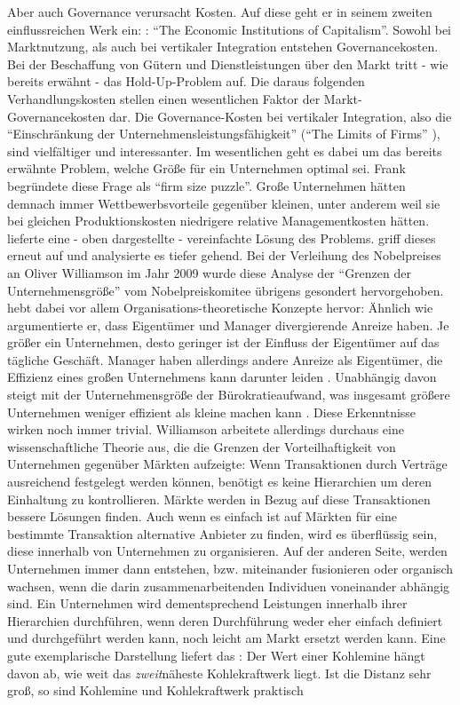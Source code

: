 Aber auch Governance verursacht Kosten. Auf diese geht er in seinem zweiten einflussreichen Werk ein: \textcite{Williamson1985}: "`The Economic Institutions of Capitalism"'. Sowohl bei Marktnutzung, als auch bei vertikaler Integration entstehen Governancekosten. Bei der Beschaffung von Gütern und Dienstleistungen über den Markt tritt - wie bereits erwähnt - das Hold-Up-Problem auf. Die daraus folgenden Verhandlungskosten stellen einen wesentlichen Faktor der Markt-Governancekosten dar. Die Governance-Kosten bei vertikaler Integration, also die "`Einschränkung der Unternehmensleistungsfähigkeit"' ("`The Limits of Firms"' \parencite[S. 131ff]{Williamson1985}), sind vielfältiger und interessanter. Im wesentlichen geht es dabei um das bereits erwähnte Problem, welche Größe für ein Unternehmen optimal sei. Frank \textcite{Knight1921} begründete diese Frage als "`firm size puzzle"'. Große Unternehmen hätten demnach immer Wettbewerbsvorteile gegenüber kleinen, unter anderem weil sie bei gleichen Produktionskosten niedrigere relative Managementkosten hätten. \textcite{Coase1937} lieferte eine - oben dargestellte - vereinfachte Lösung des Problems. \textcite[S. 131ff]{Williamson1985} griff dieses erneut auf und analysierte es tiefer gehend. Bei der Verleihung des Nobelpreises an Oliver Williamson im Jahr 2009 wurde diese Analyse der "`Grenzen der Unternehmensgröße"' vom Nobelpreiskomitee übrigens gesondert hervorgehoben. \textcite{Williamson1985} hebt dabei vor allem Organisations-theoretische Konzepte hervor: Ähnlich wie \textcite{Jensen1976} argumentierte er, dass Eigentümer und Manager divergierende Anreize haben. Je größer ein Unternehmen, desto geringer ist der Einfluss der Eigentümer auf das tägliche Geschäft. Manager haben allerdings andere Anreize als Eigentümer, die Effizienz eines großen Unternehmens kann darunter leiden \parencite[S. 144ff]{Williamson1985}. Unabhängig davon steigt mit der Unternehmensgröße der Bürokratieaufwand, was insgesamt größere Unternehmen weniger effizient als kleine machen kann \parencite[S. 148ff]{Williamson1985}. Diese Erkenntnisse wirken noch immer trivial. Williamson arbeitete allerdings durchaus eine wissenschaftliche Theorie aus, die die Grenzen der Vorteilhaftigkeit von Unternehmen gegenüber Märkten aufzeigte: Wenn Transaktionen durch Verträge ausreichend festgelegt werden können, benötigt es keine Hierarchien um deren Einhaltung zu kontrollieren. Märkte werden in Bezug auf diese Transaktionen bessere Lösungen finden. Auch wenn es einfach ist auf Märkten für eine bestimmte Transaktion  alternative Anbieter zu finden, wird es überflüssig sein, diese innerhalb von Unternehmen zu organisieren. Auf der anderen Seite, werden Unternehmen immer dann entstehen, bzw. miteinander fusionieren oder organisch wachsen, wenn die darin zusammenarbeitenden Individuen voneinander abhängig sind. Ein Unternehmen wird dementsprechend Leistungen innerhalb ihrer Hierarchien durchführen, wenn deren Durchführung weder eher einfach definiert und durchgeführt werden kann, noch leicht am Markt ersetzt werden kann. Eine gute exemplarische Darstellung liefert das \textcite{Nobelopreiskomitee2009}: Der Wert einer Kohlemine hängt davon ab, wie weit das \textit{zweit}näheste Kohlekraftwerk liegt. Ist die Distanz sehr groß, so sind Kohlemine und Kohlekraftwerk praktisch 